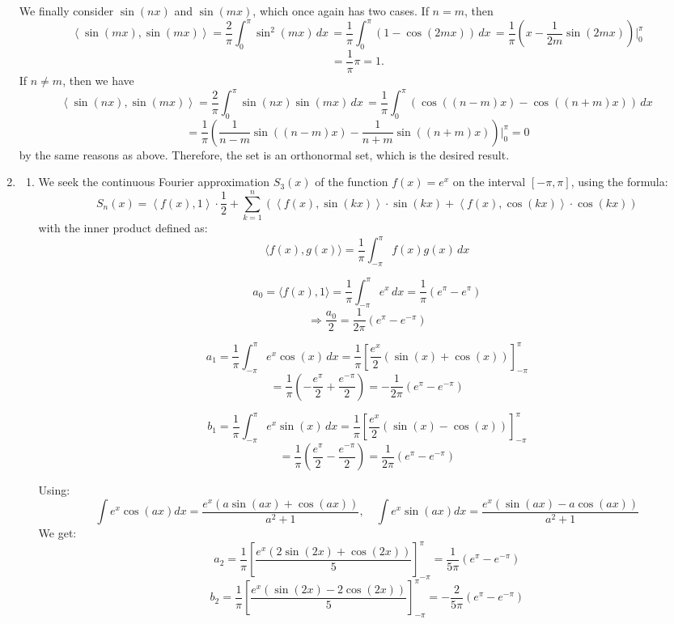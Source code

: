 \documentclass[12pt]{article}
\begin{document}
\begin{enumerate}[leftmargin=0em]
    \smallskip

    \noindent We finally consider $\sin(nx)$ and $\sin(mx)$, which once again has two cases. If $n=m$, then
    \[\left\langle \sin(mx), \sin(mx) \right\rangle=\frac{2}{\pi}\int_{0}^{\pi}\sin^2(mx)\, dx\, = \frac{1}{\pi}\int_{0}^{\pi}\left(1-\cos(2mx)\right)\, dx\, =\frac{1}{\pi}\left(x-\frac{1}{2m}\sin(2mx)\right)\bigg\rvert_{0}^{\pi}\]
    \[=\frac{1}{\pi}\pi = 1.\]
    If $n\neq m$, then we have
    \[\left\langle \sin(nx), \sin(mx) \right\rangle=\frac{2}{\pi}\int_{0}^{\pi}\sin(nx)\sin(mx)\, dx\, = \frac{1}{\pi}\int_{0}^{\pi} \left(\cos((n-m)x)-\cos((n+m)x)\right)\, dx\,\]
    \[=\frac{1}{\pi}\left(\frac{1}{n-m}\sin((n-m)x)-\frac{1}{n+m}\sin((n+m)x)\right)\bigg\rvert_{0}^{\pi} = 0 \]
    by the same reasons as above. Therefore, the set is an orthonormal set, which is the desired result. 

    \item
    \begin{enumerate}[leftmargin=!]
        \item
        We seek the continuous Fourier approximation \( S_3(x) \) of the function \( f(x) = e^x \) on the interval \( [-\pi, \pi] \), using the formula:
        \[S_n(x) = \left\langle f(x), 1 \right\rangle \cdot \frac{1}{2} + \sum_{k=1}^{n} \left( \left\langle f(x), \sin(kx) \right\rangle \cdot \sin(kx) + \left\langle f(x), \cos(kx) \right\rangle \cdot \cos(kx) \right)\]
        with the inner product defined as:
        \[\langle f(x), g(x) \rangle = \frac{1}{\pi} \int_{-\pi}^{\pi} f(x) g(x) \, dx\]

        \[a_0 = \langle f(x), 1 \rangle = \frac{1}{\pi} \int_{-\pi}^{\pi} e^x \, dx = \frac{1}{\pi} (e^{\pi} - e^{\pi})\]
        \[\Rightarrow \frac{a_0}{2} = \frac{1}{2\pi}(e^{\pi} - e^{-\pi})\]

        \[a_1 = \frac{1}{\pi} \int_{-\pi}^{\pi} e^x \cos(x) \, dx = \frac{1}{\pi} \left[ \frac{e^x}{2} (\sin(x) +\cos(x)) \right]_{-\pi}^{\pi}\]
        \[= \frac{1}{\pi} \left( -\frac{e^{\pi}}{2} + \frac{e^{-\pi}}{2} \right) = -\frac{1}{2\pi}(e^{\pi} - e^{-\pi})\]

        \[b_1 = \frac{1}{\pi} \int_{-\pi}^{\pi} e^x \sin(x) \, dx = \frac{1}{\pi} \left[ \frac{e^x}{2} (\sin(x) - \cos(x)) \right]_{-\pi}^{\pi}\]
        \[= \frac{1}{\pi} \left( \frac{e^{\pi}}{2} - \frac{e^{-\pi}}{2} \right) = \frac{1}{2\pi}(e^{\pi} - e^{-\pi})\]

        Using:
        \[\int e^x \cos(ax) dx = \frac{e^x (a \sin(ax) + \cos(ax))}{a^2 + 1}, \quad\int e^x \sin(ax) dx = \frac{e^x (\sin(ax) - a \cos(ax))}{a^2 + 1}\]
        We get:
        \[a_2 = \frac{1}{\pi} \left[ \frac{e^x (2 \sin(2x) + \cos(2x))}{5} \right]_{-\pi}^{\pi}= \frac{1}{5\pi}(e^{\pi} - e^{-\pi})\]
        \[b_2 = \frac{1}{\pi} \left[ \frac{e^x (\sin(2x) - 2 \cos(2x))}{5} \right]_{-\pi}^{\pi}= -\frac{2}{5\pi}(e^{\pi} - e^{-\pi})\]


\end{enumerate}
\end{enumerate}
\end{document}
